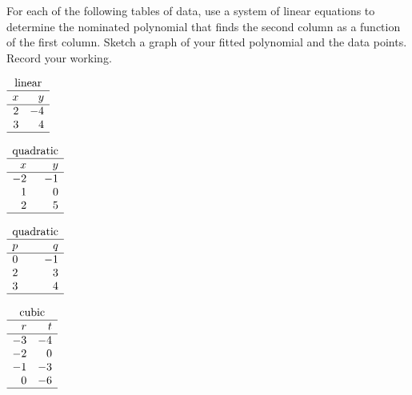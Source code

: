 \begin{exercise}  
For each of the following tables of data, use a system of linear equations to determine the nominated polynomial that finds the second column as a function of the first column.
Sketch a graph of your fitted polynomial and the data points.
Record your working.
\begin{Parts}
\item  \(\begin{array}{rr}
\multicolumn2c{\text{linear}}\\\hline
x&y\\\hline
2&-4\\
3&4\\\hline
\end{array}\)

\item  \(\begin{array}{rr}
\multicolumn2c{\text{quadratic}}\\\hline
x&y\\\hline
-2&-1\\
1&0\\
2&5\\\hline
\end{array}\)

\item  \(\begin{array}{rr}
\multicolumn2c{\text{quadratic}}\\\hline
p&q\\\hline
0&-1\\
2&3\\
3&4\\\hline
\end{array}\)

\item  \(\begin{array}{rr}
\multicolumn2c{\text{cubic}}\\\hline
r&t\\\hline
-3&-4\\
-2&0\\
-1&-3\\
0&-6\\\hline
\end{array}\)

\end{Parts}
\end{exercise}




